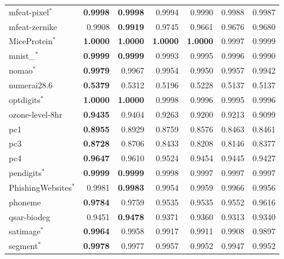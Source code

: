 {\begin{longtable}{>{\raggedright\arraybackslash}p{3.3cm}rrrrrr}
mfeat-pixel$^{*}$ & \textbf{\num{0.9998}} & \textbf{\num{0.9998}} & \num{0.9994} & \num{0.9990} & \num{0.9988} & \num{0.9987} \\
mfeat-zernike & \num{0.9908} & \textbf{\num{0.9919}} & \num{0.9745} & \num{0.9661} & \num{0.9676} & \num{0.9680} \\
Mice\allowbreak Protein$^{*}$ & \textbf{\num{1.0000}} & \textbf{\num{1.0000}} & \textbf{\num{1.0000}} & \textbf{\num{1.0000}} & \num{0.9997} & \num{0.9999} \\
mnist\_\allowbreak 784$^{*}$ & \textbf{\num{0.9999}} & \textbf{\num{0.9999}} & \num{0.9993} & \num{0.9995} & \num{0.9996} & \num{0.9990} \\
nomao$^{*}$ & \textbf{\num{0.9979}} & \num{0.9967} & \num{0.9954} & \num{0.9950} & \num{0.9957} & \num{0.9942} \\
numerai28.6 & \textbf{\num{0.5379}} & \num{0.5312} & \num{0.5196} & \num{0.5228} & \num{0.5137} & \num{0.5137} \\
optdigits$^{*}$ & \textbf{\num{1.0000}} & \textbf{\num{1.0000}} & \num{0.9998} & \num{0.9996} & \num{0.9995} & \num{0.9996} \\
ozone-level-8hr & \textbf{\num{0.9435}} & \num{0.9404} & \num{0.9263} & \num{0.9200} & \num{0.9213} & \num{0.9099} \\
pc1 & \textbf{\num{0.8955}} & \num{0.8929} & \num{0.8759} & \num{0.8576} & \num{0.8463} & \num{0.8461} \\
pc3 & \textbf{\num{0.8728}} & \num{0.8706} & \num{0.8433} & \num{0.8208} & \num{0.8146} & \num{0.8377} \\
pc4 & \textbf{\num{0.9647}} & \num{0.9610} & \num{0.9524} & \num{0.9454} & \num{0.9445} & \num{0.9427} \\
pendigits$^{*}$ & \textbf{\num{0.9999}} & \textbf{\num{0.9999}} & \num{0.9998} & \num{0.9997} & \num{0.9997} & \num{0.9997} \\
Phishing\allowbreak Websites$^{*}$ & \num{0.9981} & \textbf{\num{0.9983}} & \num{0.9954} & \num{0.9959} & \num{0.9966} & \num{0.9956} \\
phoneme & \textbf{\num{0.9784}} & \num{0.9759} & \num{0.9535} & \num{0.9535} & \num{0.9552} & \num{0.9616} \\
qsar-biodeg & \num{0.9451} & \textbf{\num{0.9478}} & \num{0.9371} & \num{0.9360} & \num{0.9313} & \num{0.9340} \\
satimage$^{*}$ & \textbf{\num{0.9964}} & \num{0.9958} & \num{0.9917} & \num{0.9911} & \num{0.9908} & \num{0.9897} \\
segment$^{*}$ & \textbf{\num{0.9978}} & \num{0.9977} & \num{0.9957} & \num{0.9952} & \num{0.9947} & \num{0.9952} \\

\end{longtable}}

